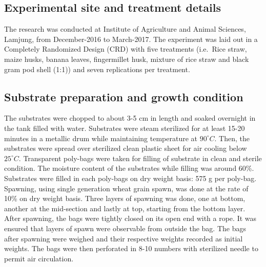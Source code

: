 \documentclass[]{article}
\begin{document}
\hypertarget{experimental-site-and-treatment-details}{%
\subsection{Experimental site and treatment details}\label{experimental-site-and-treatment-details}}

The research was conducted at Institute of Agriculture and Animal Sciences, Lamjung, from December-2016 to March-2017. The experiment was laid out in a Completely Randomized Design (CRD) with five treatments (i.e.~Rice straw, maize husks, banana leaves, fingermillet husk, mixture of rice straw and black gram pod shell (1:1)) and seven replications per treatment.

\hypertarget{substrate-preparation-and-growth-condition}{%
\subsection{Substrate preparation and growth condition}\label{substrate-preparation-and-growth-condition}}

The substrates were chopped to about 3-5 cm in length and soaked overnight in the tank filled with water. Substrates were steam sterilized for at least 15-20 minutes in a metallic drum while maintaining temperature at \(90^\circ C\). Then, the substrates were spread over sterilized clean plastic sheet for air cooling below \(25^\circ C\). Transparent poly-bags were taken for filling of substrate in clean and sterile condition. The moisture content of the substrates while filling was around 60\%. Substrates were filled in each poly-bags on dry weight basis: 575 g per poly-bag. Spawning, using single generation wheat grain spawn, was done at the rate of 10\% on dry weight basis. Three layers of spawning was done, one at bottom, another at the mid-section and lastly at top, starting from the bottom layer. After spawning, the bags were tightly closed on its open end with a rope. It was ensured that layers of spawn were observable from outside the bag. The bags after spawning were weighed and their respective weights recorded as initial weights. The bags were then perforated in 8-10 numbers with sterilized needle to permit air circulation.
\end{document}
